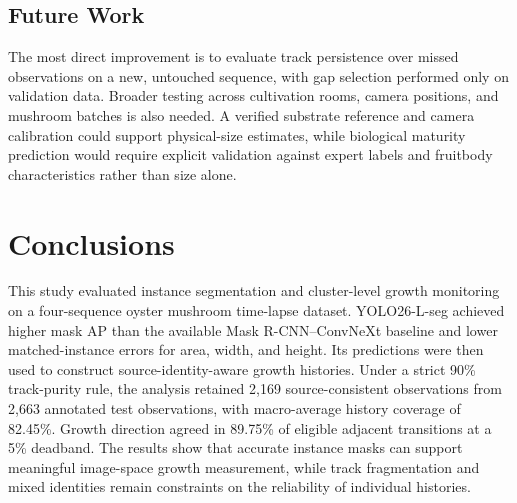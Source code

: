 \documentclass[11pt,a4paper]{article}
\begin{document}
\subsection{Future Work}

The most direct improvement is to evaluate track persistence over missed observations on a new, untouched sequence, with gap selection performed only on validation data. Broader testing across cultivation rooms, camera positions, and mushroom batches is also needed. A verified substrate reference and camera calibration could support physical-size estimates, while biological maturity prediction would require explicit validation against expert labels and fruitbody characteristics rather than size alone.

\section{Conclusions}

This study evaluated instance segmentation and cluster-level growth monitoring on a four-sequence oyster mushroom time-lapse dataset. YOLO26-L-seg achieved higher mask AP than the available Mask R-CNN--ConvNeXt baseline and lower matched-instance errors for area, width, and height. Its predictions were then used to construct source-identity-aware growth histories. Under a strict 90\% track-purity rule, the analysis retained 2,169 source-consistent observations from 2,663 annotated test observations, with macro-average history coverage of 82.45\%. Growth direction agreed in 89.75\% of eligible adjacent transitions at a 5\% deadband. The results show that accurate instance masks can support meaningful image-space growth measurement, while track fragmentation and mixed identities remain constraints on the reliability of individual histories.
\end{document}
